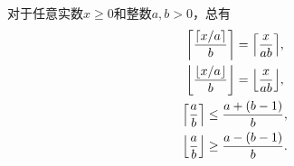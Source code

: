 \begin{property}
对于任意实数\(x \geq 0\)和整数\(a,b>0\)，总有\begin{gather}
	\ceil*{\frac{\ceil{x/a}}{b}} = \ceil*{\frac{x}{ab}}, \\
	\floor*{\frac{\floor{x/a}}{b}} = \floor*{\frac{x}{ab}}, \\
	\ceil*{\frac{a}{b}} \leq \frac{a+(b-1)}{b}, \\
	\floor*{\frac{a}{b}} \geq \frac{a-(b-1)}{b}.
\end{gather}
\end{property}
